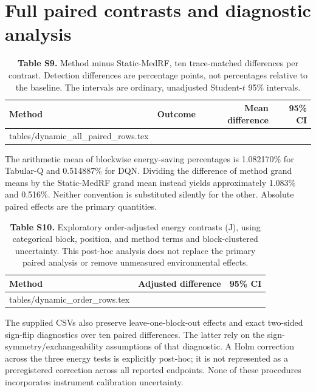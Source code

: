 \documentclass[10pt,a4paper]{article}
\makeatletter
\newcommand{\tableinput}[1]{\@@input #1.tex }
\makeatother
\begin{document}
\clearpage
\section{Full paired contrasts and diagnostic analysis}
\begin{table}[h!]
\centering\small
\caption*{\textbf{Table S9.} Method minus Static-MedRF, ten trace-matched differences per contrast. Detection differences are percentage points, not percentages relative to the baseline. The intervals are ordinary, unadjusted Student-$t$ 95\% intervals.}
\begin{tabular}{llrr}\toprule
Method & Outcome & Mean difference & 95\% CI\\\midrule
\tableinput{tables/dynamic_all_paired_rows}
\bottomrule\end{tabular}
\end{table}

The arithmetic mean of blockwise energy-saving percentages is 1.082170\% for Tabular-Q and 0.514887\% for DQN. Dividing the difference of method grand means by the Static-MedRF grand mean instead yields approximately 1.083\% and 0.516\%. Neither convention is substituted silently for the other. Absolute paired effects are the primary quantities.

\begin{table}[h!]
\centering\small
\caption*{\textbf{Table S10.} Exploratory order-adjusted energy contrasts (J), using categorical block, position, and method terms and block-clustered uncertainty. This post-hoc analysis does not replace the primary paired analysis or remove unmeasured environmental effects.}
\begin{tabular}{lrr}\toprule
Method & Adjusted difference & 95\% CI\\\midrule
\tableinput{tables/dynamic_order_rows}
\bottomrule\end{tabular}
\end{table}
The supplied CSVs also preserve leave-one-block-out effects and exact two-sided sign-flip diagnostics over ten paired differences. The latter rely on the sign-symmetry/exchangeability assumptions of that diagnostic. A Holm correction across the three energy tests is explicitly post-hoc; it is not represented as a preregistered correction across all reported endpoints. None of these procedures incorporates instrument calibration uncertainty.

\clearpage
\end{document}
